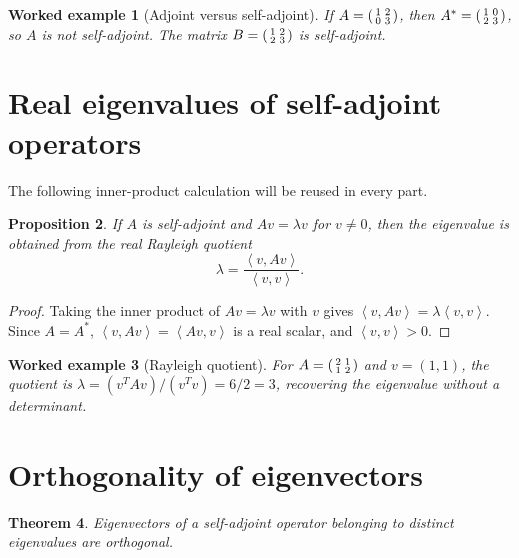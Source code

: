 \documentclass[11pt,a5paper,oneside,openany]{scrreprt}
\theoremstyle{notes}
\newtheorem{theorem}{Theorem}[section]
\newtheorem{proposition}[theorem]{Proposition}
\theoremstyle{definitions}
\newtheorem{example}[theorem]{Worked example}
\newcommand{\ip}[2]{\left\langle #1,#2\right\rangle}
\begin{document}
\begin{example}[Adjoint versus self-adjoint]
If
$A=\begin{psmallmatrix}1&2\\0&3\end{psmallmatrix}$, then
$A^*=\begin{psmallmatrix}1&0\\2&3\end{psmallmatrix}$, so $A$ is not
self-adjoint.  The matrix
$B=\begin{psmallmatrix}1&2\\2&3\end{psmallmatrix}$ is self-adjoint.
\end{example}

\section{Real eigenvalues of self-adjoint operators}

The following inner-product calculation will be reused in every part.

\begin{proposition}
If $A$ is self-adjoint and $Av=\lambda v$ for $v\ne0$, then the eigenvalue is
obtained from the real Rayleigh quotient
\[
  \boxed{\lambda=\frac{\ip{v}{Av}}{\ip{v}{v}}}.
\]
\end{proposition}

\begin{proof}
Taking the inner product of $Av=\lambda v$ with $v$ gives
$\ip{v}{Av}=\lambda\ip{v}{v}$.  Since $A=A^*$,
$\ip{v}{Av}=\ip{Av}{v}$ is a real scalar, and $\ip{v}{v}>0$.
\end{proof}

\begin{example}[Rayleigh quotient]
For $A=\begin{psmallmatrix}2&1\\1&2\end{psmallmatrix}$ and
$v=(1,1)$, the quotient is
$\lambda=(v^TAv)/(v^Tv)=6/2=3$, recovering the eigenvalue without a
determinant.
\end{example}

\section{Orthogonality of eigenvectors}

\begin{theorem}
Eigenvectors of a self-adjoint operator belonging to distinct eigenvalues are
orthogonal.
\end{theorem}
\end{document}
